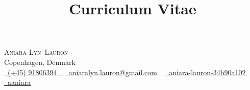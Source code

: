 \documentclass[a4paper,11pt,english,final,hidelinks]{curve}
\title{Curriculum Vitae}
\makeatletter
\newcommand{\firstname}{Aniara Lyn}
\newcommand{\lastname}{Lauron}
\newcommand{\address}{Copenhagen, Denmark}
\newcommand{\phoneno}{+4591806394}
\newcommand{\phonenoprint}{(+45) 91806394}
\newcommand{\email}{aniaralyn.lauron@gmail.com}
\newcommand{\linkedin}{aniara-lauron-34b90a102}
\newcommand{\github}{aaniara}
\makeatother
\begin{document}
\begin{center}
    {\LARGE \scshape \firstname~\lastname} \\
    \address \\
    \small \href{tel:\phoneno}{ \raisebox{-0.1\height}\faPhone\ \underline{\phonenoprint} ~} \href{mailto:\email}{\raisebox{-0.2\height}\faEnvelope\  \underline{\email}} ~ 
    \href{https://linkedin.com/in/\linkedin}{\raisebox{-0.2\height}\faLinkedin\ \underline{\linkedin}}  ~
    \href{https://github.com/\github}{\raisebox{-0.2\height}\faGithub\ \underline{\github}} ~
    \vspace{-5pt}
\end{center}


%

% 
\end{document}
